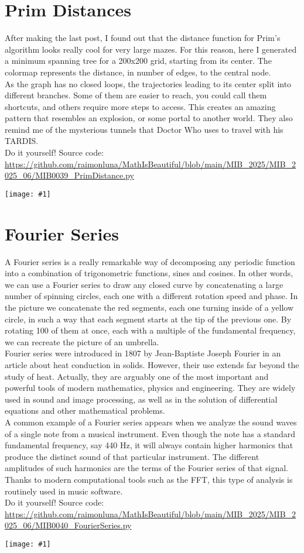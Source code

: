 \documentclass[12pt,landscape]{article}
\newcommand{\artpage}[3][]{%
  \begin{minipage}[t]{0.48\linewidth}
    \vspace{0pt} %
    \section*{#2} %
    \addcontentsline{toc}{section}{#2} %
    #3 %
  \end{minipage}%
  \hfill
  \begin{minipage}[t]{0.48\linewidth}
    \vspace{0pt} %
    \centering
    \texttt{[image: \#1]}
  \end{minipage}%
  \newpage
}
\begin{document}
\artpage[../Output/LowQuality/MIB0039_PrimDistances.png]{Prim Distances}{%
After making the last post, I found out that the distance function for Prim's algorithm looks really cool for very large mazes. For this reason, here I generated a minimum spanning tree for a 200x200 grid, starting from its center. The colormap represents the distance, in number of edges, to the central node. \\

As the graph has no closed loops, the trajectories leading to its center split into different branches. Some of them are easier to reach, you could call them shortcuts, and others require more steps to access. This creates an amazing pattern that resembles an explosion, or some portal to another world. They also remind me of the mysterious tunnels that Doctor Who uses to travel with his TARDIS.\\

Do it yourself! Source code: \url{https://github.com/raimonluna/MathIsBeautiful/blob/main/MIB_2025/MIB_2025_06/MIB0039_PrimDistance.py}
}

\artpage[../Output/LowQuality/MIB0040_FourierSeries.png]{Fourier Series}{%
A Fourier series is a really remarkable way of decomposing any periodic function into a combination of trigonometric functions, sines and cosines. In other words, we can use a Fourier series to draw any closed curve by concatenating a large number of spinning circles, each one with a different rotation speed and phase. In the picture we concatenate the red segments, each one turning inside of a yellow circle, in such a way that each segment starts at the tip of the previous one. By rotating 100 of them at once, each with a multiple of the fundamental frequency, we can recreate the picture of an umbrella.\\

Fourier series were introduced in 1807 by Jean-Baptiste Joseph Fourier in an article about heat conduction in solids. However, their use extends far beyond the study of heat. Actually, they are arguably one of the most important and powerful tools of modern mathematics, physics and engineering. They are widely used in sound and image processing, as well as in the solution of differential equations and other mathematical problems.\\

A common example of a Fourier series appears when we analyze the sound waves of a single note from a musical instrument. Even though the note has a standard fundamental frequency, say 440 Hz, it will always contain higher harmonics that produce the distinct sound of that particular instrument. The different amplitudes of such harmonics are the terms of the Fourier series of that signal. Thanks to modern computational tools such as the FFT, this type of analysis is routinely used in music software.\\

Do it yourself! Source code: \url{https://github.com/raimonluna/MathIsBeautiful/blob/main/MIB_2025/MIB_2025_06/MIB0040_FourierSeries.py}
}
\end{document}
